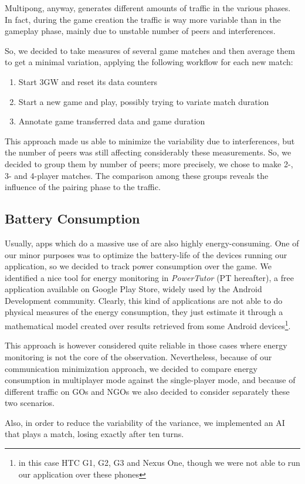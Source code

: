 Multipong, anyway, generates different amounts of traffic in the various
phases. In fact, during the game creation the traffic is way more variable than
in the gameplay phase, mainly due to unstable number of peers and \wifi{}
interferences.

So, we decided to take measures of several game matches and then average them
to get a minimal variation, applying the following workflow for each new match:

\begin{enumerate} %
  \item Start 3GW and reset its data counters
  \item Start a new game and play, possibly trying to variate match duration
  \item Annotate game transferred data and game duration
\end{enumerate}

This approach made us able to minimize the variability due to interferences, but the number of peers was still affecting considerably these measurements. So, we decided to group them by number of peers; more precisely, we chose to make 2-, 3- and 4-player matches. The comparison among these groups reveals the influence of the pairing phase to the traffic.

\subsection{Battery Consumption}

Usually, apps which do a massive use of \wifi{} are also highly energy-consuming. One of our minor purposes was to optimize the battery-life of the devices running our application, so we decided to track power consumption over the game. We identified a nice tool for energy monitoring in \textit{PowerTutor} (PT hereafter), a free application available on Google Play Store, widely used by the Android Development community. Clearly, this kind of applications are not able to do physical measures of the energy consumption, they just estimate it through a mathematical model created over results retrieved from some Android devices\footnote{in this case HTC G1, G2, G3 and Nexus One, though we were not able to run our application over these phones}.

This approach is however considered quite reliable in those cases where energy monitoring is not the core of the observation. Nevertheless, because of our communication minimization approach, we decided to compare energy consumption in multiplayer mode against the single-player mode, and because of different traffic on GOs and NGOs we also decided to consider separately these two scenarios.

Also, in order to reduce the variability of the variance, we implemented an AI
that plays a match, losing exactly after ten turns.
